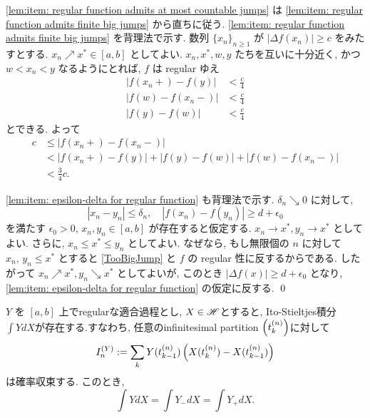 \documentclass{ltjsarticle}
\begin{document}
\begin{prf}
	\ref{lem:item: regular function admits at most countable jumps} は \ref{lem:item: regular function admits finite big jumps} から直ちに従う.
	\ref{lem:item: regular function admits finite big jumps} を背理法で示す.
	数列 \( \{ x_n \}_{ n \ge 1} \) が \( | \Delta f( x_n ) | \ge c \) をみたすとする.
	\( x_n \nearrow x^* \in [a,b] \) としてよい.
	\( x_n, x^*, w, y \) たちを互いに十分近く, かつ \( w < x_n < y \) なるようにとれば, \( f \) は regular ゆえ
	\begin{equation}
		\begin{aligned}
			\left| f( x_n+ ) - f( y ) \right| & <	\frac{c}{4} \\
			\left| f( w ) - f( x_n- ) \right| & <	\frac{c}{4} \\
			\left| f( y ) - f( w ) \right|    & <	\frac{c}{4}
		\end{aligned}
	\end{equation}
	とできる. よって
	\begin{equation}
		\begin{aligned}
			c & \le \left| f( x_n+ ) - f( x_n- ) \right|                         \\
			  & <		\left| f( x_n+ ) - f( y ) \right|
			+ \left| f( y ) - f( w ) \right| + \left| f( w ) - f( x_n- ) \right| \\
			  & <		\frac{3}{4}c.
		\end{aligned}
	\end{equation}
	
	\ref{lem:item: epsilon-delta for regular function} も背理法で示す.
	\( \delta_n \searrow 0 \) に対して,
	\begin{equation}		\label{TooBigJump}
		| x_n - y_n | \le \delta_n, \quad | f( x_n ) - f( y_n ) | \ge d + \epsilon_0
	\end{equation}
	を満たす \( \epsilon_0 > 0 \), \( x_n, y_n \in [a,b] \) が存在すると仮定する.
	\( x_n \to x^*, y_n \to x^* \) としてよい.
	さらに, \( x_n \le x^* \le y_n \) としてよい. 
	なぜなら, もし無限個の \( n \) に対して \( x_n,\, y_n \le x^* \) とすると \eqref{TooBigJump} と \( f \) の regular 性に反するからである.
	したがって \( x_n \nearrow x^*, y_n \searrow x^* \) としてよいが, このとき
	\( | \Delta f(x) | \ge d + \epsilon_0 \) となり, \ref{lem:item: epsilon-delta for regular function} の仮定に反する.
	\qed\end{prf}


\begin{prp}
	\( Y \) を \( [a,b] \) 上でregularな適合過程とし, \( X \in \mathscr{H} \)とすると, Ito-Stieltjes積分\( \int Y dX \)が存在する.すなわち, 任意のinfinitesimal partition \( \left( t_k^{(n)} \right) \)に対して
	\[
		I_n^{ (Y) } := \sum_k Y(t_{k-1}^{(n)}) \left( X(t_k^{(n)}) - X(t_{k-1}^{(n)}) \right)
	\]
	は確率収束する. このとき, 
	\begin{equation}		\label{JumpsNotMatter}
		\int Y dX = \int Y_{-}dX = \int Y_{+}dX.
	\end{equation}
\end{prp}
\end{document}
